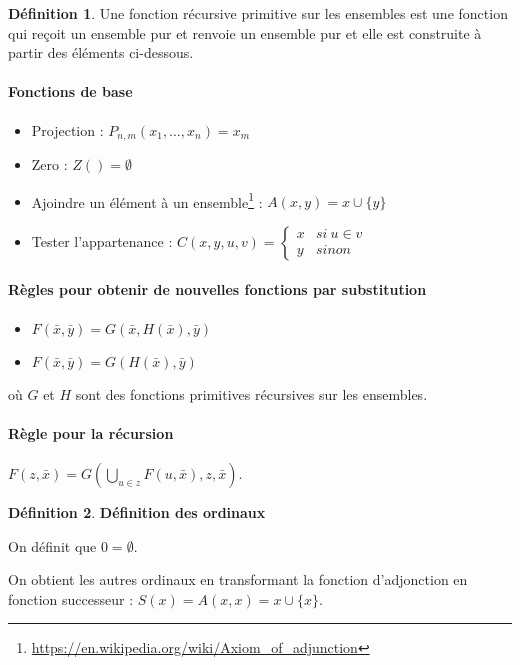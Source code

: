 \documentclass{book}
\theoremstyle{definition}
\newtheorem{definition}{Définition}
\numberwithin{lemma}{subsection}
\numberwithin{theorem}{subsection}
\numberwithin{definition}{subsection}
\numberwithin{proposition}{subsection}
\numberwithin{corollary}{subsection}
\numberwithin{property}{subsection}
\numberwithin{example}{subsection}
\numberwithin{heuristique}{subsection}
\numberwithin{scenario}{subsection}
\begin{document}
            \begin{definition}
                \par Une fonction récursive primitive sur les ensembles est une fonction qui reçoit un ensemble pur et renvoie un ensemble pur et elle est construite à partir des éléments ci-dessous.
                \paragraph{Fonctions de base}
                \begin{itemize}
                    \item Projection : $P_{n,m}(x_1,\ldots,x_n) = x_m$
                    \item Zero : $Z() = \emptyset$
                    \item Ajoindre un élément à un ensemble\footnote{\url{https://en.wikipedia.org/wiki/Axiom\_of\_adjunction}} : $A(x,y) = x \cup \{y\}$
                    \item Tester l'appartenance : $C(x,y,u,v) = \begin{cases}
                        x & si~ u \in v \\
                        y & sinon 
                    \end{cases}$
                \end{itemize}
                \paragraph{Règles pour obtenir de nouvelles fonctions par substitution}
                \begin{itemize}
                    \item $F(\bar{x},\bar{y}) = G(\bar{x},H(\bar{x}),\bar{y})$
                    \item $F(\bar{x},\bar{y}) = G(H(\bar{x}),\bar{y})$
                \end{itemize}
                où $G$ et $H$ sont des fonctions primitives récursives sur les ensembles. 
            \end{definition}
            \paragraph{Règle pour la récursion}
            $F(z,\bar{x}) = G(\bigcup\limits_{u\in z}F(u,\bar{x}),z,\bar{x})$.
            \begin{definition}\textbf{Définition des ordinaux}
                \par On définit que $0 = \emptyset$.
                \par On obtient les autres ordinaux en transformant la fonction d'adjonction en fonction successeur : $S(x) = A(x,x) = x \cup \{x\}$.
            \end{definition}
\end{document}
